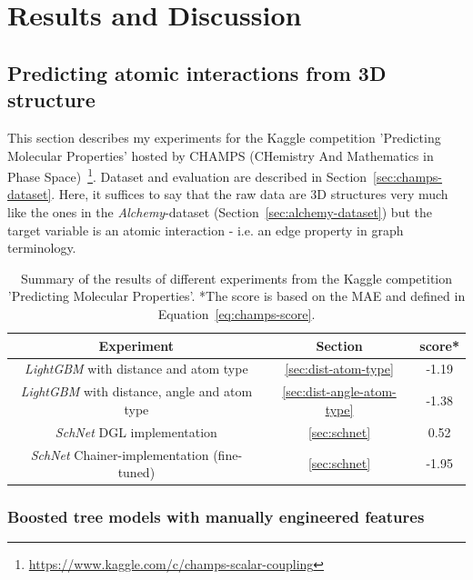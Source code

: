 \chapter{Results and Discussion}
\label{chapter:Results}

\section{Predicting atomic interactions from 3D structure}
\label{sec:champs}

This section describes my experiments for the Kaggle competition 'Predicting Molecular Properties' hosted by CHAMPS (CHemistry And Mathematics in Phase Space)~\footnote{\url{https://www.kaggle.com/c/champs-scalar-coupling}}.
Dataset and evaluation are described in Section~\ref{sec:champs-dataset}. Here, it suffices to say that the raw data are 3D structures very much like the ones in the \textit{Alchemy}-dataset (Section~\ref{sec:alchemy-dataset}) but the target variable is an atomic interaction - i.e. an edge property in graph terminology.


\begin{table}[H]
\begin{centering}
	\begin{tabular}{||c | c | c||} 
		\hline
		\textbf{Experiment} & \textbf{Section} & \textbf{score*} \\ [0.5ex] 
		\hline\hline
		\textit{LightGBM} with distance and atom type & \ref{sec:dist-atom-type} & -1.19 \\ 
		\textit{LightGBM} with distance, angle and atom type & \ref{sec:dist-angle-atom-type} & -1.38 \\
		\textit{SchNet} DGL implementation & \ref{sec:schnet} & 0.52  \\
		\textit{SchNet} Chainer-implementation (fine-tuned) & \ref{sec:schnet} & -1.95 \\ [1ex] 
		\hline
	\end{tabular}
	\vspace{0.5cm}
	\caption{Summary of the results of different experiments from the Kaggle competition 'Predicting Molecular Properties'. *The score is based on the MAE and defined in Equation~\ref{eq:champs-score}.}
	\label{tab:champs-results}
\end{centering}
\end{table}


\subsection{Boosted tree models with manually engineered features}
\label{sec:champs-boosted-tree}


